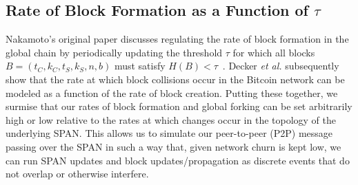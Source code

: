 \subsection{Rate of Block Formation as a Function of $\tau$}

Nakamoto's original paper discusses regulating the rate of block formation in
the global chain by
periodically updating the threshold $\tau$ for which all blocks
$B=(t_C, k_C, t_S, k_S, n, b)$ must satisfy $H(B)<\tau$~\cite{nakamoto2008bitcoin}.
Decker \textit{et al.} subsequently show that the rate at which block collisions
occur in the Bitcoin network can be modeled as a function of the rate of block
creation. Putting these together, we surmise that our rates of block formation
and global forking can be set arbitrarily high or low relative to the rates at
which changes occur in the topology of the underlying SPAN. This allows us to
simulate our peer-to-peer (P2P) message passing over the SPAN in such
a way that, given network churn is kept low, we can run SPAN updates and
block updates/propagation as discrete events that do not overlap or otherwise
interfere.

